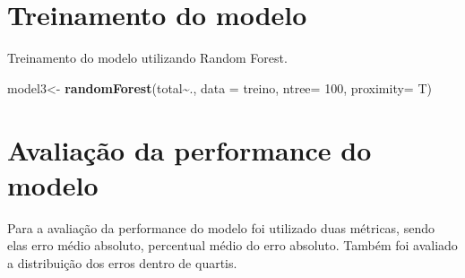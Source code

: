\documentclass[
]{article}
\newenvironment{Shaded}{\begin{snugshade}}{\end{snugshade}}
\newcommand{\DataTypeTok}[1]{\textcolor[rgb]{0.13,0.29,0.53}{#1}}
\newcommand{\DecValTok}[1]{\textcolor[rgb]{0.00,0.00,0.81}{#1}}
\newcommand{\KeywordTok}[1]{\textcolor[rgb]{0.13,0.29,0.53}{\textbf{#1}}}
\newcommand{\NormalTok}[1]{#1}
\newcommand{\OperatorTok}[1]{\textcolor[rgb]{0.81,0.36,0.00}{\textbf{#1}}}
\newcommand{\StringTok}[1]{\textcolor[rgb]{0.31,0.60,0.02}{#1}}
\begin{document}
\hypertarget{treinamento-do-modelo-2}{%
\section{Treinamento do modelo}\label{treinamento-do-modelo-2}}

Treinamento do modelo utilizando Random Forest.

\begin{Shaded}
\begin{Highlighting}[]
\NormalTok{model3\textless{}{-}}\StringTok{ }\KeywordTok{randomForest}\NormalTok{(total}\OperatorTok{\textasciitilde{}}\NormalTok{., }\DataTypeTok{data =}\NormalTok{ treino,}
                      \DataTypeTok{ntree=} \DecValTok{100}\NormalTok{, }\DataTypeTok{proximity=}\NormalTok{ T)}
\end{Highlighting}
\end{Shaded}

\hypertarget{avaliauxe7uxe3o-da-performance-do-modelo-2}{%
\section{Avaliação da performance do
modelo}\label{avaliauxe7uxe3o-da-performance-do-modelo-2}}

Para a avaliação da performance do modelo foi utilizado duas métricas,
sendo elas erro médio absoluto, percentual médio do erro absoluto.
Também foi avaliado a distribuição dos erros dentro de quartis.
\end{document}
